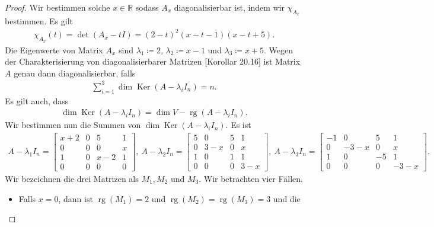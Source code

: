 \documentclass[draft,a5paper]{article}
\theoremstyle{remark}
\DeclareMathOperator{\Ker}{Ker}
\DeclareMathOperator{\rg}{rg}
\begin{document}
\begin{proof}
  Wir bestimmen solche \(x \in \mathbb{R}\) sodass \(A_{x}\) diagonalisierbar
  ist, indem wir \(\chi_{A_{x}}\) bestimmen.  Es gilt
  \begin{align*}
    \chi_{A_{x}}(t) = \det(A_{x} - tI) = (2 - t)^{2} (x - t - 1) (x - t +
    5).
  \end{align*}
  Die Eigenwerte von Matrix \(A_{x}\) sind \(\lambda_{1} \coloneq 2\),
  \(\lambda_{2} \coloneq x-1\) und \(\lambda_{3} \coloneq x+5\).  Wegen der Charakterisierung
  von diagonalisierbarer Matrizen [Korollar 20.16] ist Matrix \(A\)
  genau dann diagonalisierbar, falls
  \begin{align*}
    \sum_{i = 1}^{3}{\dim \Ker(A - \lambda_{i} I_{n})} = n.
  \end{align*}
  Es gilt auch, dass
  \begin{align*}
    \dim \Ker(A - \lambda_{i} I_{n}) =  \dim V - \rg (A - \lambda_{i} I_{n}).
  \end{align*}
  Wir bestimmen nun die Summen von \(\dim \Ker(A - \lambda_{i} I_{n})\).  Es
  ist
  \begin{align*}
    A - \lambda_{1}I_{n} =
    \begin{bmatrix}
      x + 2 & 0 & 5 & 1 \\
      0 & 0 & 0 & x \\
      1 & 0 & x - 2 & 1 \\
      0 & 0 & 0 & 0
    \end{bmatrix},~
    A - \lambda_{2}I_{n} =
    \begin{bmatrix}
      5 & 0 & 5 & 1 \\
      0 & 3 - x & 0 & x \\
      1 & 0 & 1 & 1 \\
      0 & 0 & 0 & 3-x
    \end{bmatrix},~
    A - \lambda_{3}I_{n} =
    \begin{bmatrix}
      -1 & 0 & 5 & 1 \\
      0 & -3-x & 0 & x \\
      1 & 0 & -5 & 1 \\
      0 & 0 & 0 & -3-x
    \end{bmatrix}.
  \end{align*}
  Wir bezeichnen die drei Matrizen als \(M_{1}, M_{2}\) und \(M_{3}\).
  Wir betrachten vier Fällen.
  \begin{itemize}
  \item   Falls \(x = 0\), dann ist
    \(\rg(M_{1}) = 2\) und \(\rg(M_{2}) = \rg(M_{3}) = 3\) und die

\end{itemize}
\end{proof}
\end{document}
